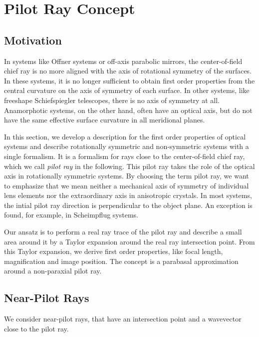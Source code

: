 \documentclass[12pt,a4paper,twoside,openright,BCOR10mm,headsepline,titlepage,abstracton,chapterprefix,final]{scrreprt}
\begin{document}
\section{Pilot Ray Concept}

\subsection{Motivation}

In systems like Offner systems or off-axis parabolic mirrors, the center-of-field chief ray is no more aligned with the axis of rotational symmetry of the surfaces.
In these systems, it is no longer sufficient to obtain first order properties from the central curvature on the axis of symmetry of each surface.
In other systems, like freeshape Schiefspiegler telescopes, there is no axis of symmetry at all. 
Anamorphotic systems, on the other hand, often have an optical axis, but do not have the same effective surface curvature in all meridional planes.

In this section, we develop a description for the first order properties of optical systems 
and describe rotationally symmetric and non-symmetric systems with a single formalism.
It is a formalism for rays close to the center-of-field chief ray, which we call \emph{pilot ray} in the following.
This pilot ray takes the role of the optical axis in rotationally symmetric systems. 
By choosing the term pilot ray, we want to emphasize that we mean neither a mechanical axis of symmetry of individual lens elements nor the extraordinary axis in anisotropic crystals.
In most systems, the intial pilot ray direction is perpendicular to the object plane. 
An exception is found, for example, in Scheimpflug systems.

Our ansatz is to perform a real ray trace of the pilot ray and describe a small area around it by a Taylor expansion around the real ray intersection point.
From this Taylor expansion, we derive first order properties, like focal length, magnification and image position.
The concept is a parabasal approximation around a non-paraxial pilot ray.



\subsection{Near-Pilot Rays}

We consider near-pilot rays, that have an intersection point and a wavevector close to the pilot ray.
\end{document}
